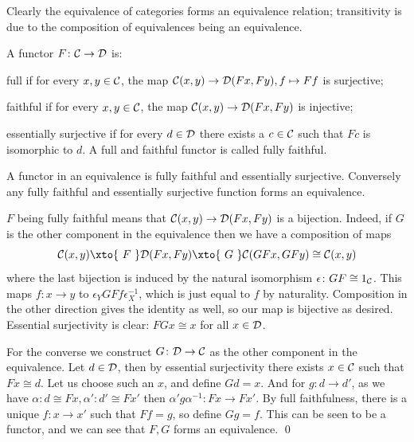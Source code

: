 \edefn

Clearly the equivalence of categories forms an equivalence relation; transitivity is due to the composition of equivalences being an equivalence.

\bdefn

    A functor $F\colon{{\cal C}}\to{{\cal D}}$ is:
    \benum
        \item {\emphcolor full} if for every $x,y\in{{\cal C}}$, the map ${{\cal C}}(x,y)\to{{\cal D}}(Fx,Fy),f\mapsto Ff$ is surjective;
        \item {\emphcolor faithful} if for every $x,y\in{{\cal C}}$, the map ${{\cal C}}(x,y)\to{{\cal D}}(Fx,Fy)$ is injective;
        \item {\emphcolor essentially surjective} if for every $d\in{{\cal D}}$ there exists a $c\in{{\cal C}}$ such that $Fc$ is isomorphic to $d$.
    \eenum
    A full and faithful functor is called {\emphcolor fully faithful}.

\edefn

\bthrm

    A functor in an equivalence is fully faithful and essentially surjective.
    Conversely any fully faithful and essentially surjective function forms an equivalence.

\ethrm

\bproof

    $F$ being fully faithful means that ${{\cal C}}(x,y)\to{{\cal D}}(Fx,Fy)$ is a bijection.
    Indeed, if $G$ is the other component in the equivalence then we have a composition of maps
    $$ \C(x,y)\xto{\ F\ }\D(Fx,Fy)\xto{\ G\ }\C(GFx,GFy)\cong\C(x,y) $$
    where the last bijection is induced by the natural isomorphism $\epsilon\colon GF\cong1_{{\cal C}}$.
    This maps $f\colon x\to y$ to $\epsilon_YGFf\epsilon^{-1}_X$, which is just equal to $f$ by naturality.
    Composition in the other direction gives the identity as well, so our map is bijective as desired.
    Essential surjectivity is clear: $FGx\cong x$ for all $x\in{{\cal D}}$.

    For the converse we construct $G\colon{{\cal D}}\to{{\cal C}}$ as the other component in the equivalence.
    Let $d\in{{\cal D}}$, then by essential surjectivity there exists $x\in{{\cal C}}$ such that $Fx\cong d$.
    Let us choose such an $x$, and define $Gd=x$.
    And for $g\colon d\to d'$, as we have $\alpha\colon d\cong Fx,\alpha'\colon d'\cong Fx'$ then $\alpha'g\alpha^{-1}\colon Fx\to Fx'$.
    By full faithfulness, there is a unique $f\colon x\to x'$ such that $Ff=g$, so define $Gg=f$.
    This can be seen to be a functor, and we can see that $F,G$ forms an equivalence.
    \qed

